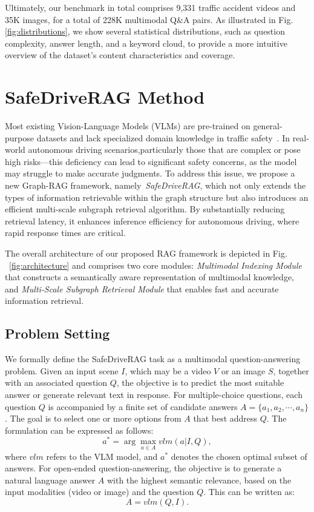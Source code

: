 \documentclass[sigconf]{acmart}
\newcommand{\qms}[1]{\textcolor{blue}{#1}} %
\begin{document}
Ultimately, our benchmark in total comprises 9,331 traffic accident videos and 35K images, for a total of 228K multimodal Q$\&$A pairs. As illustrated in Fig. \ref{fig:distributions}, we show several statistical distributions, such as question complexity, answer length, and a keyword cloud, to provide a more intuitive overview of the dataset’s content characteristics and coverage. 



\section{SafeDriveRAG Method}

Most existing Vision-Language Models (VLMs) are pre-trained on general-purpose datasets and lack specialized domain knowledge in traffic safety~\cite{tian2024drivevlm}. In real-world autonomous driving scenarios,particularly those that are complex or pose high risks—this deficiency can lead to significant safety concerns, as the model may struggle to make accurate judgments. To address this issue, we propose a new Graph-RAG framework, namely~\emph{SafeDriveRAG}, which not only extends the types of information retrievable within the graph structure but also introduces an efficient multi-scale subgraph retrieval algorithm. By substantially reducing retrieval latency, it enhances inference efficiency for autonomous driving, where rapid response times are critical.

The overall architecture of our proposed RAG framework is depicted in Fig. ~\ref{fig:architecture} and comprises two core modules: \emph{Multimodal Indexing Module} that constructs a semantically aware representation of multimodal knowledge, and \emph{Multi-Scale Subgraph Retrieval Module} that enables fast and accurate information retrieval.

\subsection{Problem Setting}
We formally define the SafeDriveRAG task as a multimodal question-answering problem. Given an input scene $I$, which may be a video $V$ or an image $S$,  together with an associated question $Q$, the objective is to predict the most suitable answer or generate relevant text in response. For multiple-choice questions, each question $Q$ is accompanied by a finite set of candidate answers $A=\{a_1,a_2,\cdots,a_n\}$. The goal is to select one or more options from $A$ that best address $Q$. The formulation can be expressed as follows:
\begin{equation}a^*=\arg\max_{a\in{A}}vlm(a| I,Q),\end{equation}
where $vlm$ refers to the VLM model, and $a^*$ denotes the chosen optimal subset of answers. For open-ended question-answering, the objective is to generate a natural language answer $A$ with the highest semantic relevance, based on the input modalities (video or image) and the question $Q$. This can be written as:
\begin{equation}A=vlm(Q, I).\end{equation}
\end{document}
